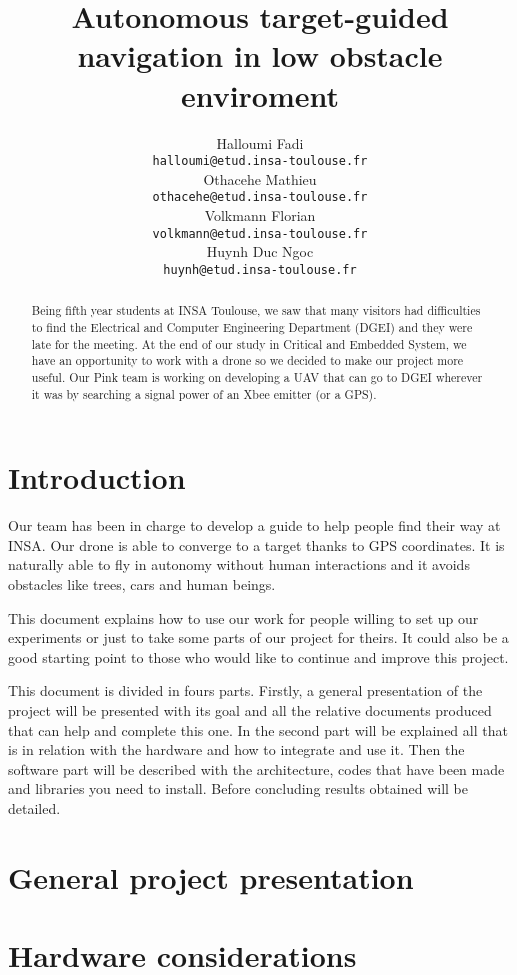 \documentclass[10pt,a4paper,titlepage]{report}
\author{Halloumi Fadi\\\texttt{halloumi@etud.insa-toulouse.fr}\\
Othacehe Mathieu\\\texttt{othacehe@etud.insa-toulouse.fr}\\
Volkmann Florian\\\texttt{volkmann@etud.insa-toulouse.fr}\\
Huynh Duc Ngoc\\\texttt{huynh@etud.insa-toulouse.fr}}
\title{Autonomous target-guided navigation in low obstacle enviroment}
\begin{document}
\maketitle %
\begin{abstract} %
Being fifth year students at INSA Toulouse, we saw that many visitors had difficulties to find the Electrical and Computer Engineering Department (DGEI) and they were late for the meeting. At the end of our study in Critical and Embedded System, we have an opportunity to work with a drone so we decided to make our project more useful. Our Pink team is working on developing a UAV that can go to DGEI wherever it was by searching a signal power of an Xbee emitter (or a GPS).
\end{abstract}

\tableofcontents %
\clearpage


\chapter{Introduction}
Our team has been in charge to develop a guide to help people find their way at INSA. Our drone is able to converge to a target thanks to GPS coordinates. It is naturally able to fly in autonomy without human interactions and it avoids obstacles like trees, cars and human beings.

This document explains how to use our work for people willing to set up our experiments or just to take some parts of our project for theirs. It could also be a good starting point to those who would like to continue and improve this project.

This document is divided in fours parts. Firstly, a general presentation of the project will be presented with its goal and all the relative documents produced that can help and complete this one. In the second part will be explained all that is in relation with the hardware and how to integrate and use it. Then the software part will be described with the architecture, codes that have been made and libraries you need to install. Before concluding results obtained will be detailed.

\chapter{General project presentation}

\chapter{Hardware considerations}

\end{document}
